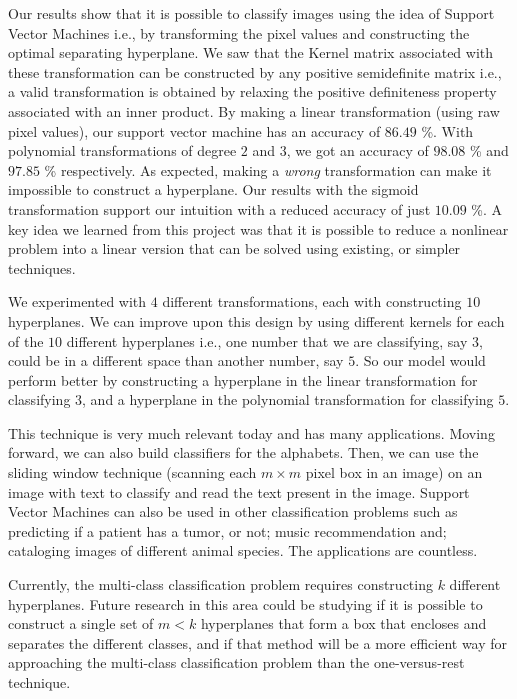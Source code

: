 Our results show that it is possible to classify images using the idea of Support Vector Machines i.e., by transforming the pixel values and constructing the optimal separating hyperplane. We saw that the Kernel matrix associated with these transformation can be constructed by any positive semidefinite matrix i.e., a valid transformation is obtained by relaxing the positive definiteness property associated with an inner product. By making a linear transformation (using raw pixel values), our support vector machine has an accuracy of $86.49$ \%. With polynomial transformations of degree $2$ and $3$, we got an accuracy of $98.08$ \% and $97.85$ \% respectively. As expected, making a \textit{wrong} transformation can make it impossible to construct a hyperplane. Our results with the sigmoid transformation support our intuition with a reduced accuracy of just $10.09$ \%. A key idea we learned from this project was that it is possible to reduce a nonlinear problem into a linear version that can be solved using existing, or simpler techniques. 

We experimented with $4$ different transformations, each with constructing $10$ hyperplanes. We can improve upon this design by using different kernels for each of the $10$ different hyperplanes i.e., one number that we are classifying, say $3$, could be in a different space than another number, say $5$. So our model would perform better by constructing a hyperplane in the linear transformation for classifying $3$, and a hyperplane in the polynomial transformation for classifying $5$.

This technique is very much relevant today and has many applications. Moving forward, we can also build classifiers for the alphabets. Then, we can use the sliding window technique (scanning each $m\times m$ pixel box in an image) on an image with text to classify and read the text present in the image. Support Vector Machines can also be used in other classification problems such as predicting if a patient has a tumor, or not; music recommendation and; cataloging images of different animal species. The applications are countless.

Currently, the multi-class classification problem requires constructing $k$ different hyperplanes. Future research in this area could be studying if it is possible to construct a single set of $m < k$ hyperplanes that form a box that encloses and separates the different classes, and if that method will be a more efficient way for approaching the multi-class classification problem than the one-versus-rest technique.